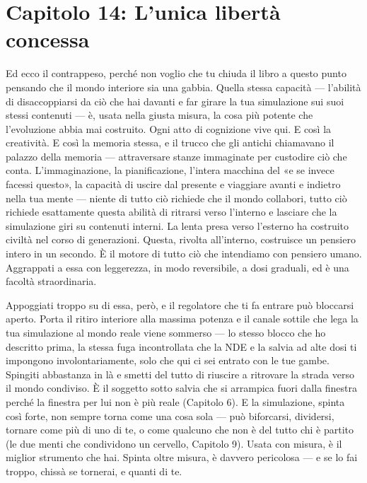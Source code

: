 \documentclass[11pt, twoside, openright]{book}
\begin{document}
\chapter*{Capitolo 14: L'unica libertà concessa}

Ed ecco il contrappeso, perché non voglio che tu chiuda il libro a questo punto pensando che il mondo interiore sia una gabbia. Quella stessa capacità --- l'abilità di disaccoppiarsi da ciò che hai davanti e far girare la tua simulazione sui suoi stessi contenuti --- è, usata nella giusta misura, la cosa più potente che l'evoluzione abbia mai costruito. Ogni atto di cognizione vive qui. E così la creatività. E così la memoria stessa, e il trucco che gli antichi chiamavano il palazzo della memoria --- attraversare stanze immaginate per custodire ciò che conta. L'immaginazione, la pianificazione, l'intera macchina del «e se invece facessi questo», la capacità di uscire dal presente e viaggiare avanti e indietro nella tua mente --- niente di tutto ciò richiede che il mondo collabori, tutto ciò richiede esattamente questa abilità di ritrarsi verso l'interno e lasciare che la simulazione giri su contenuti interni. La lenta presa verso l'esterno ha costruito civiltà nel corso di generazioni. Questa, rivolta all'interno, costruisce un pensiero intero in un secondo. È il motore di tutto ciò che intendiamo con pensiero umano. Aggrappati a essa con leggerezza, in modo reversibile, a dosi graduali, ed è una facoltà straordinaria.

Appoggiati troppo su di essa, però, e il regolatore che ti fa entrare può bloccarsi aperto. Porta il ritiro interiore alla massima potenza e il canale sottile che lega la tua simulazione al mondo reale viene sommerso --- lo stesso blocco che ho descritto prima, la stessa fuga incontrollata che la NDE e la salvia ad alte dosi ti impongono involontariamente, solo che qui ci sei entrato con le tue gambe. Spingiti abbastanza in là e smetti del tutto di riuscire a ritrovare la strada verso il mondo condiviso. È il soggetto sotto salvia che si arrampica fuori dalla finestra perché la finestra per lui non è più reale (Capitolo 6). E la simulazione, spinta così forte, non sempre torna come una cosa sola --- può biforcarsi, dividersi, tornare come più di uno di te, o come qualcuno che non è del tutto chi è partito (le due menti che condividono un cervello, Capitolo 9). Usata con misura, è il miglior strumento che hai. Spinta oltre misura, è davvero pericolosa --- e se lo fai troppo, chissà se tornerai, e quanti di te.
\end{document}
